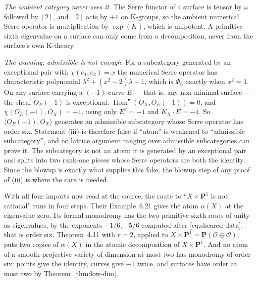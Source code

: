 \documentclass[11pt]{article}
\theoremstyle{definition}
\theoremstyle{remark}
\newcommand{\PP}{\mathbf P}
\begin{document}
\emph{The ambient category never sees it.} The Serre functor of a surface is
tensor by $\omega$ followed by $[2]$, and $[2]$ acts by $+1$ on K-groups, so the
ambient numerical Serre operator is multiplication by $\exp(K)$, which is
unipotent. A primitive sixth eigenvalue on a surface can only come from a
decomposition, never from the surface's own K-theory.

\emph{The warning: admissible is not enough.} For a subcategory generated by an
exceptional pair with $\chi(e_1,e_2)=x$ the numerical Serre operator has
characteristic polynomial $\lambda^2+(x^2-2)\lambda+1$, which is $\Phi_6$ exactly
when $x^2=1$. On any surface carrying a $(-1)$-curve $E$ --- that is, any
non-minimal surface --- the sheaf $O_E(-1)$ is exceptional,
$\operatorname{Hom}^\bullet(O_X,O_E(-1))=0$, and $\chi(O_E(-1),O_X)=-1$, using
only $E^2=-1$ and $K_X\cdot E=-1$.
So $\langle O_E(-1),O_X\rangle$ generates an admissible subcategory whose Serre
operator has order six. Statement (iii) is therefore false if ``atom'' is
weakened to ``admissible subcategory'', and no lattice argument ranging over
admissible subcategories can prove it. The subcategory is not an atom: it is
generated by an exceptional pair and splits into two rank-one pieces whose Serre
operators are both the identity. Since the blowup is exactly what supplies this
fake, the blowup step of any proof of (iii) is where the care is needed.

With all four imports now read at the source, the route to
``$X\times\PP^1$ is not rational'' runs in four steps. Their Example~6.21 gives
the atom $\alpha(X)$ at the eigenvalue zero. Its formal monodromy has the two
primitive sixth roots of unity as eigenvalues, by the exponents $-1/6,-5/6$
computed after \textup{[eq:sheared-data]}; that is order six. Theorem~4.11 with
$r=2$, applied to $X\times\PP^1=\PP(\mathcal O\oplus\mathcal O)$, puts two copies
of $\alpha(X)$ in the atomic decomposition of $X\times\PP^1$. And no atom of a
smooth projective variety of dimension at most two has monodromy of order six:
points give the identity, curves give $-1$ twice, and surfaces have order at most
two by Theorem~\textup{[thm:low-dim]}.
\end{document}
